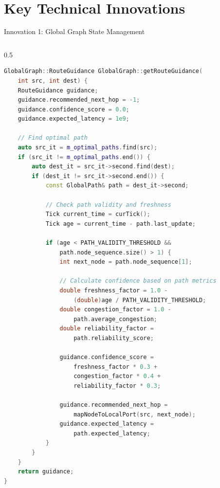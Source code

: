 \documentclass[10pt,aspectratio=169]{beamer}
\begin{document}
\section{Key Technical Innovations}

\begin{frame}[fragile]{Innovation 1: Global Graph State Management}
    \begin{columns}[T]
        \begin{column}{0.5\textwidth}
            \begin{lstlisting}[language=C++,caption=Global Graph Implementation (Router.cc:2237-2286)]
GlobalGraph::RouteGuidance GlobalGraph::getRouteGuidance(
    int src, int dest) {
    RouteGuidance guidance;
    guidance.recommended_next_hop = -1;
    guidance.confidence_score = 0.0;
    guidance.expected_latency = 1e9;
    
    // Find optimal path
    auto src_it = m_optimal_paths.find(src);
    if (src_it != m_optimal_paths.end()) {
        auto dest_it = src_it->second.find(dest);
        if (dest_it != src_it->second.end()) {
            const GlobalPath& path = dest_it->second;
            
            // Check path validity and freshness
            Tick current_time = curTick();
            Tick age = current_time - path.last_update;
            
            if (age < PATH_VALIDITY_THRESHOLD && 
                path.node_sequence.size() > 1) {
                int next_node = path.node_sequence[1];
                
                // Calculate confidence based on path metrics
                double freshness_factor = 1.0 - 
                    (double)age / PATH_VALIDITY_THRESHOLD;
                double congestion_factor = 1.0 - 
                    path.average_congestion;
                double reliability_factor = 
                    path.reliability_score;
                
                guidance.confidence_score = 
                    freshness_factor * 0.3 +
                    congestion_factor * 0.4 +
                    reliability_factor * 0.3;
                
                guidance.recommended_next_hop = 
                    mapNodeToLocalPort(src, next_node);
                guidance.expected_latency = 
                    path.expected_latency;
            }
        }
    }
    return guidance;
}
            \end{lstlisting}
        \end{column}
        

\end{columns}
\end{frame}
\end{document}
